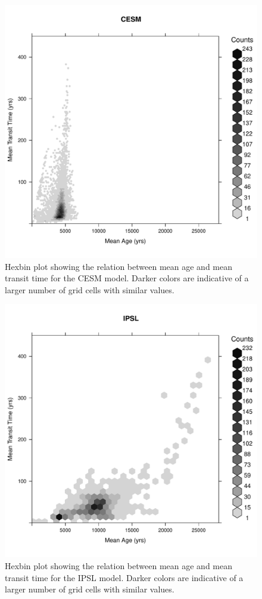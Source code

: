 \documentclass{agujournal}
\begin{document}
\begin{figure}[t]
   \centering
   \includegraphics{Figures/hexbinplot_TTvsA_CESM} %
   \caption{Hexbin plot showing the relation between mean age and mean transit time for the CESM model. Darker colors are indicative of a larger number of grid cells with similar values.}
\end{figure}

\begin{figure}[t]
   \centering
   \includegraphics{Figures/hexbinplot_TTvsA_IPSL} %
   \caption{Hexbin plot showing the relation between mean age and mean transit time for the IPSL model. Darker colors are indicative of a larger number of grid cells with similar values.}
\end{figure}
\end{document}

